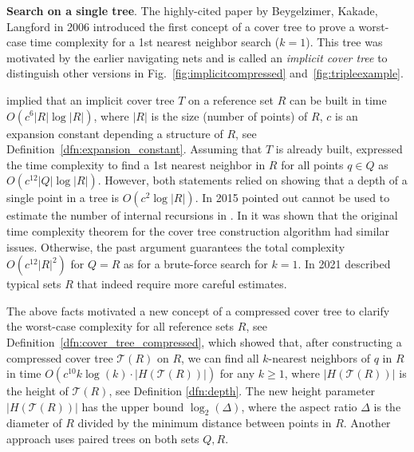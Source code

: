 \documentclass[a4paper,UKenglish,cleveref, autoref]{lipics-v2019}
\numberwithin{algocf}{section}
\theoremstyle{definition}
\theoremstyle{definition}
\theoremstyle{definition}
\theoremstyle{plain}
\newcommand{\T}{\mathcal{T}}
\begin{document}
\textbf{Search on a single tree}.
The highly-cited paper \cite{beygelzimer2006cover} by Beygelzimer, Kakade, Langford in 2006 introduced the first concept of a cover tree to prove a worst-case time complexity for a 1st nearest neighbor search ($k=1$).
This tree was motivated by the earlier navigating nets \cite{krauthgamer2004navigating} and is called an \emph{implicit cover tree} to distinguish other versions in Fig.~\ref{fig:implicitcompressed} and~\ref{fig:tripleexample}.
\medskip

\cite[Theorem~6]{beygelzimer2006cover} implied that an implicit cover tree $T$ on a reference set $R$ can be built in time $O(c^6|R|\log|R|)$, where $|R|$ is the size (number of points) of $R$, $c$ is an expansion constant depending a structure of $R$, see Definition~\ref{dfn:expansion_constant}. 
Assuming that $T$ is already built, \cite[Theorem~5]{beygelzimer2006cover} expressed the time complexity to find a 1st nearest neighbor in $R$ for all points $q\in Q$ as $O(c^{12}|Q|\log|R|)$. 
However, both statements relied on \cite[Lemma~4.3]{beygelzimer2006cover} showing that a depth of a single point in a tree is $O(c^2\log|R|)$.
In 2015 \cite[Section~5.3]{curtin2015improving} pointed out \cite[Lemma~4.3]{beygelzimer2006cover} cannot be used to estimate the number of internal recursions in \cite[Theorem~5]{beygelzimer2006cover}. In \cite[section~3]{elkin2021new} it was shown that the original time complexity theorem for the cover tree construction algorithm \cite[Theorem~6]{beygelzimer2006cover} had similar issues. 
Otherwise, the past argument guarantees the total complexity $O(c^{12}|R|^2)$ for $Q=R$ as for a brute-force search for $k=1$.
In 2021 \cite[section~3]{elkin2021new} described typical sets $R$ that indeed require more careful estimates. 
\medskip

The above facts motivated a new concept of a compressed cover tree to clarify the worst-case complexity for all reference sets $R$, see Definition~\ref{dfn:cover_tree_compressed}, which 
\cite[Theorem~6.5]{elkin2021new} showed that, after constructing a compressed cover tree $\T(R)$ on $R$, we can find all $k$-nearest neighbors of $q$ in $R$ in time $O(c^{10}k\log (k) \cdot |H(\T(R))|)$  for any $k\geq 1$, where $|H(\T(R))|$ is the height of $\T(R)$, see Definition \ref{dfn:depth}.
The new height parameter $|H(\T(R))|$ has the upper bound $\log_2(\Delta)$, where the aspect ratio $\Delta$ is the diameter of $R$ divided by the minimum distance between points in $R$. 
Another approach uses paired trees on both sets $Q,R$.
\medskip
\end{document}
